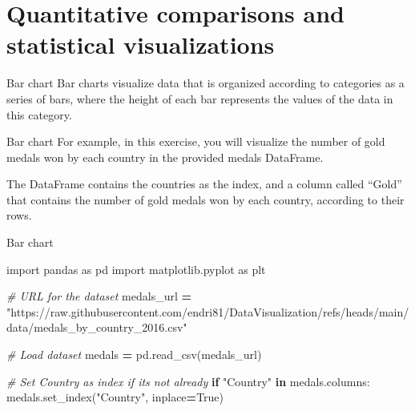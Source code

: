 \documentclass[
  ignorenonframetext,
]{beamer}
\newenvironment{Shaded}{\begin{snugshade}}{\end{snugshade}}
\newcommand{\CommentTok}[1]{\textcolor[rgb]{0.56,0.35,0.01}{\textit{#1}}}
\newcommand{\ControlFlowTok}[1]{\textcolor[rgb]{0.13,0.29,0.53}{\textbf{#1}}}
\newcommand{\ImportTok}[1]{#1}
\newcommand{\KeywordTok}[1]{\textcolor[rgb]{0.13,0.29,0.53}{\textbf{#1}}}
\newcommand{\NormalTok}[1]{#1}
\newcommand{\OperatorTok}[1]{\textcolor[rgb]{0.81,0.36,0.00}{\textbf{#1}}}
\newcommand{\StringTok}[1]{\textcolor[rgb]{0.31,0.60,0.02}{#1}}
\newcommand{\VariableTok}[1]{\textcolor[rgb]{0.00,0.00,0.00}{#1}}
\begin{document}
\section{Quantitative comparisons and statistical
visualizations}\label{quantitative-comparisons-and-statistical-visualizations}

\begin{frame}{Bar chart}
\label{bar-chart}
Bar charts visualize data that is organized according to categories as a
series of bars, where the height of each bar represents the values of
the data in this category.
\end{frame}

\begin{frame}{Bar chart}
\label{bar-chart-1}
For example, in this exercise, you will visualize the number of gold
medals won by each country in the provided medals DataFrame.

The DataFrame contains the countries as the index, and a column called
``Gold'' that contains the number of gold medals won by each country,
according to their rows.
\end{frame}

\begin{frame}[fragile]{Bar chart}
\label{bar-chart-2}

\begin{Shaded}
\begin{Highlighting}[]
\ImportTok{import}\NormalTok{ pandas }\ImportTok{as}\NormalTok{ pd}
\ImportTok{import}\NormalTok{ matplotlib.pyplot }\ImportTok{as}\NormalTok{ plt}

\CommentTok{\# URL for the dataset}
\NormalTok{medals\_url }\OperatorTok{=} \StringTok{"https://raw.githubusercontent.com/endri81/DataVisualization/refs/heads/main/data/medals\_by\_country\_2016.csv"}

\CommentTok{\# Load dataset}
\NormalTok{medals }\OperatorTok{=}\NormalTok{ pd.read\_csv(medals\_url)}

\CommentTok{\# Set \textquotesingle{}Country\textquotesingle{} as index if it\textquotesingle{}s not already}
\ControlFlowTok{if} \StringTok{"Country"} \KeywordTok{in}\NormalTok{ medals.columns:}
\NormalTok{    medals.set\_index(}\StringTok{"Country"}\NormalTok{, inplace}\OperatorTok{=}\VariableTok{True}\NormalTok{)}


\end{Highlighting}
\end{Shaded}
\end{frame}
\end{document}
